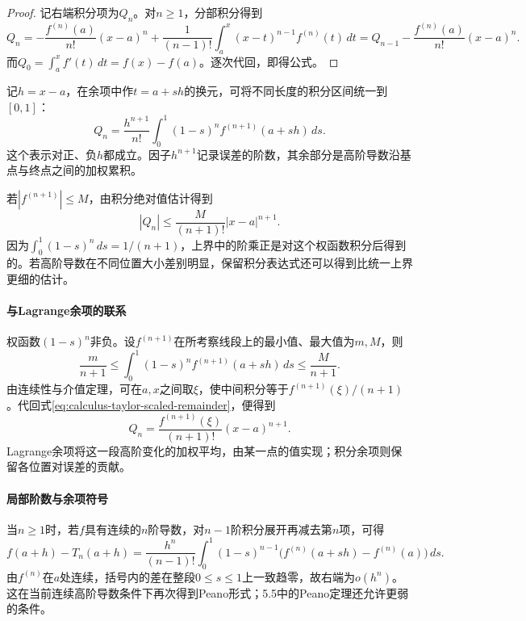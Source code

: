 \begin{proof}
记右端积分项为\(Q_n\)。对\(n\ge1\)，分部积分得到
\begin{equation*}
 Q_n=-\frac{f^{(n)}(a)}{n!}(x-a)^n
 +\frac1{(n-1)!}\int_a^x(x-t)^{n-1}f^{(n)}(t)\,dt
 =Q_{n-1}-\frac{f^{(n)}(a)}{n!}(x-a)^n.
\end{equation*}
而\(Q_0=\int_a^xf'(t)\,dt=f(x)-f(a)\)。逐次代回，即得公式。
\end{proof}

记\(h=x-a\)，在余项中作\(t=a+sh\)的换元，可将不同长度的积分区间统一到\([0,1]\)：
\begin{equation}\label{eq:calculus-taylor-scaled-remainder}
 Q_n=\frac{h^{n+1}}{n!}\int_0^1(1-s)^n f^{(n+1)}(a+sh)\,ds.
\end{equation}
这个表示对正、负\(h\)都成立。因子\(h^{n+1}\)记录误差的阶数，其余部分是高阶导数沿基点与终点之间的加权累积。

若\(|f^{(n+1)}|\le M\)，由积分绝对值估计得到
\begin{equation*}
 |Q_n|\le\frac{M}{(n+1)!}|x-a|^{n+1}.
\end{equation*}
因为\(\int_0^1(1-s)^n\,ds=1/(n+1)\)，上界中的阶乘正是对这个权函数积分后得到的。若高阶导数在不同位置大小差别明显，保留积分表达式还可以得到比统一上界更细的估计。

\paragraph{与Lagrange余项的联系} \mbox{}

权函数\((1-s)^n\)非负。设\(f^{(n+1)}\)在所考察线段上的最小值、最大值为\(m,M\)，则
\begin{equation*}
 \frac m{n+1}\le\int_0^1(1-s)^nf^{(n+1)}(a+sh)\,ds\le\frac M{n+1}.
\end{equation*}
由连续性与介值定理，可在\(a,x\)之间取\(\xi\)，使中间积分等于\(f^{(n+1)}(\xi)/(n+1)\)。代回式\eqref{eq:calculus-taylor-scaled-remainder}，便得到
\begin{equation*}
 Q_n=\frac{f^{(n+1)}(\xi)}{(n+1)!}(x-a)^{n+1}.
\end{equation*}
Lagrange余项将这一段高阶变化的加权平均，由某一点的值实现；积分余项则保留各位置对误差的贡献。

\newpage
\paragraph{局部阶数与余项符号} \mbox{}

当\(n\ge1\)时，若\(f\)具有连续的\(n\)阶导数，对\(n-1\)阶积分展开再减去第\(n\)项，可得
\begin{equation*}
 f(a+h)-T_n(a+h)=\frac{h^n}{(n-1)!}
 \int_0^1(1-s)^{n-1}\bigl(f^{(n)}(a+sh)-f^{(n)}(a)\bigr)\,ds.
\end{equation*}
由\(f^{(n)}\)在\(a\)处连续，括号内的差在整段\(0\le s\le1\)上一致趋零，故右端为\(o(h^n)\)。这在当前连续高阶导数条件下再次得到Peano形式；5.5中的Peano定理还允许更弱的条件。

